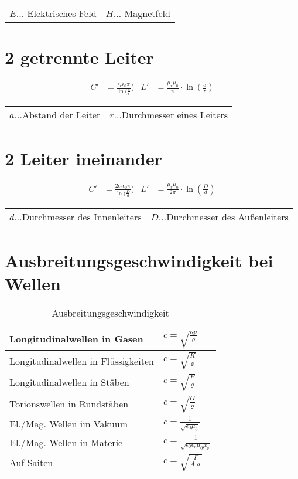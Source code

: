 		\begin{table}[h]
		\begin{tabular}{ll}
		$E\dots$ Elektrisches Feld & $H\dots$ Magnetfeld\\
		\end{tabular}
		\end{table}

	\section{2 getrennte Leiter}
		\begin{align*}
			C' &= \frac{\epsilon_r \epsilon_0 \pi}{\ln(\frac{a}{r}}) & L' &= \frac{\mu_r \mu_0}{\pi} \cdot \ln(\frac{a}{r})
		\end{align*}

		\begin{table}[h]
		\begin{tabular}{ll}
		$a\dots$Abstand der Leiter & $r\dots$Durchmesser eines Leiters\\
		\end{tabular}
		\end{table}
		
	\section{2 Leiter ineinander}
		\begin{align*}
			C' &= \frac{2\epsilon_r \epsilon_0 \pi}{\ln(\frac{D}{d}}) & L' &= \frac{\mu_r \mu_0}{2\pi} \cdot \ln(\frac{D}{d})
		\end{align*}

		\begin{table}[h]
		\begin{tabular}{ll}
		$d\dots$Durchmesser des Innenleiters & $D\dots$Durchmesser des Außenleiters\\
		\end{tabular}
		\end{table}
	\section{Ausbreitungsgeschwindigkeit bei Wellen}

		\begin{table}[here]
			\begin{tabular}{l l}
				Longitudinalwellen in Gasen & $ c = \sqrt{\frac{\kappa p}{\varrho}} $\\\midrule
				Longitudinalwellen in Flüssigkeiten & $ c = \sqrt{\frac{K}{\varrho}} $\\\midrule
				Longitudinalwellen in Stäben & $ c = \sqrt{\frac{E}{\varrho}} $\\\midrule
				Torionswellen in Rundstäben & $ c = \sqrt{\frac{G}{\varrho}} $ \\\midrule
				El./Mag. Wellen im Vakuum & $c = \frac{1}{\sqrt{\epsilon_0 \mu_0}} $\\\midrule
				El./Mag. Wellen in Materie	 	& $ c = \frac{1}{\sqrt{\epsilon_0 \epsilon_r \mu_0 \mu_r}} $\\\midrule
				Auf Saiten					& $ c = \sqrt{\frac{F}{A \varrho}} $
			\end{tabular}
			\caption{Ausbreitungsgeschwindigkeit}
		\end{table}
		
